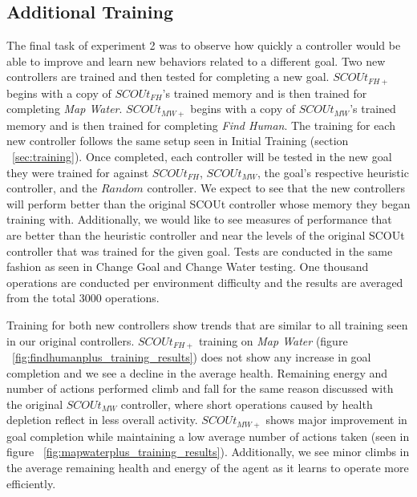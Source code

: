 \subsection{Additional Training}
The final task of experiment 2 was to observe how quickly a controller would be able to improve and learn new behaviors related to a different goal.
Two new controllers are trained and then tested for completing a new goal.
$SCOUt_{FH+}$ begins with a copy of $SCOUt_{FH}$'s trained memory and is then trained for completing \textit{Map Water}.
$SCOUt_{MW+}$ begins with a copy of $SCOUt_{MW}$'s trained memory and is then trained for completing \textit{Find Human}.
The training for each new controller follows the same setup seen in Initial Training (section ~\ref{sec:training}).
Once completed, each controller will be tested in the new goal they were trained for against $SCOUt_{FH}$, $SCOUt_{MW}$, the goal's respective heuristic controller, and the $Random$ controller.
We expect to see that the new controllers will perform better than the original SCOUt controller whose memory they began training with.
Additionally, we would like to see measures of performance that are better than the heuristic controller and near the levels of the original SCOUt controller that was trained for the given goal.
Tests are conducted in the same fashion as seen in Change Goal and Change Water testing.
One thousand operations are conducted per environment difficulty and the results are averaged from the total 3000 operations.

Training for both new controllers show trends that are similar to all training seen in our original controllers.
$SCOUt_{FH+}$ training on \textit{Map Water} (figure ~\ref{fig:findhumanplus_training_results}) does not show any increase in goal completion and we see a decline in the average health.
Remaining energy and number of actions performed climb and fall for the same reason discussed with the original $SCOUt_{MW}$ controller, where short operations caused by health depletion reflect in less overall activity.
$SCOUt_{MW+}$ shows major improvement in goal completion while maintaining a low average number of actions taken (seen in figure ~\ref{fig:mapwaterplus_training_results}).
Additionally, we see minor climbs in the average remaining health and energy of the agent as it learns to operate more efficiently.


